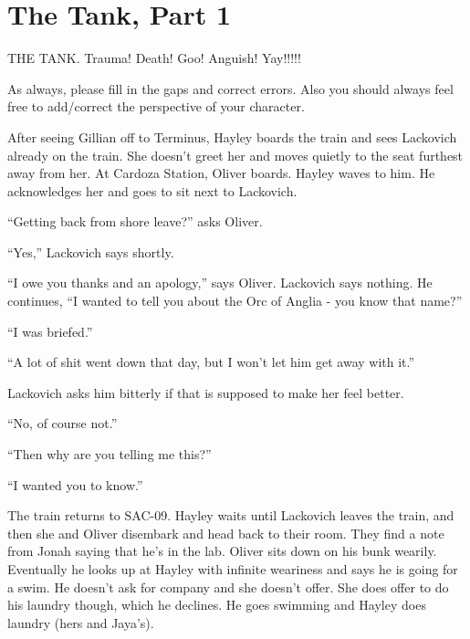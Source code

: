 \setcounter{chapter}{ 9 }
\chapter{\textbf{The Tank, Part 1} }



\subChapterTitle{}




THE TANK.  Trauma!  Death!  Goo!  Anguish!   Yay!!!!!



As always, please fill in the gaps and correct errors.  Also you should always feel free to add/correct the perspective of your character.





After seeing Gillian off to Terminus, Hayley boards the train and sees Lackovich already on the train.  She doesn't greet her and moves quietly to the seat furthest away from her.  At Cardoza Station, Oliver boards.  Hayley waves to him. He acknowledges her and goes to sit next to Lackovich.



``Getting back from shore leave?'' asks Oliver.

``Yes,'' Lackovich says shortly.

``I owe you thanks and an apology,'' says Oliver.  Lackovich says nothing.  He continues, ``I wanted to tell you about the Orc of Anglia - you know that name?''

``I was briefed.''

``A lot of shit went down that day, but I won't let him get away with it.''

Lackovich asks him bitterly if that is supposed to make her feel better.

``No, of course not.''

``Then why are you telling me this?''

``I wanted you to know.''



The train returns to SAC-09.  Hayley waits until Lackovich leaves the train, and then she and Oliver disembark and head back to their room.  They find a note from Jonah saying that he's in the lab.  Oliver sits down on his bunk wearily.  Eventually he looks up at Hayley with infinite weariness and says he is going for a swim.  He doesn't ask for company and she doesn't offer.  She does offer to do his laundry though, which he declines.  He goes swimming and Hayley does laundry (hers and Jaya's).



